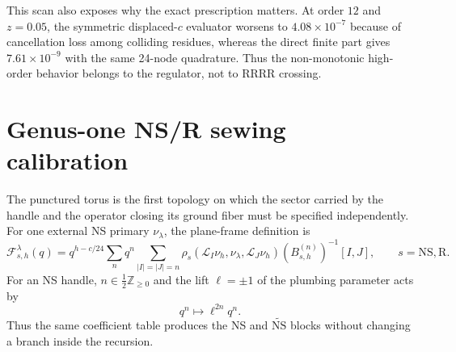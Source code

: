 \documentclass[11pt]{article}
\newcommand{\NS}{\mathrm{NS}}
\newcommand{\R}{\mathrm{R}}
\begin{document}
This scan also exposes why the exact prescription matters.  At order $12$
and $z=0.05$, the symmetric displaced-$c$ evaluator worsens to
$4.08\times10^{-7}$ because of cancellation loss among colliding residues,
whereas the direct finite part gives $7.61\times10^{-9}$ with the same
24-node quadrature.  Thus the non-monotonic high-order behavior belongs to
the regulator, not to RRRR crossing.

\section{Genus-one NS/R sewing calibration}
\label{sec:torus-code-layer}

The punctured torus is the first topology on which the sector carried by the
handle and the operator closing its ground fiber must be specified
independently.  For one external NS primary $\nu_\lambda$, the plane-frame
definition is
\begin{equation}
 \mathcal F_{s,h}^{\lambda}(q)
 =q^{h-c/24}\sum_n q^n
 \sum_{|I|=|J|=n}
 \rho_s(\mathcal L_I\nu_h,\nu_\lambda,\mathcal L_J\nu_h)
 (B_{s,h}^{(n)})^{-1}[I,J],
 \qquad s=\NS,\R .
 \label{eq:torus-direct-sewing}
\end{equation}
For an NS handle, $n\in\frac12\mathbb Z_{\ge0}$ and the lift
$\ell=\pm1$ of the plumbing parameter acts by
\begin{equation}
 q^n\longmapsto \ell^{2n}q^n.
 \label{eq:torus-ns-lift}
\end{equation}
Thus the same coefficient table produces the NS and
$\widetilde{\NS}$ blocks without changing a branch inside the recursion.
\end{document}
